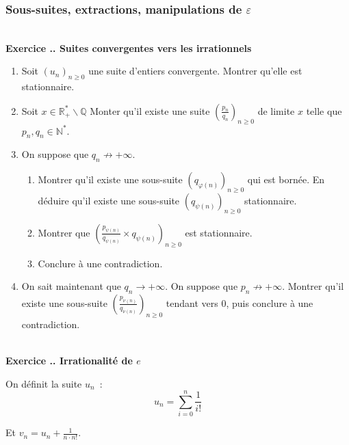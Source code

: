 \documentclass{article}
\newcommand{\mb}[1]{\mathbb{#1}}
\newcounter{exo}
\newcommand{\exercice}[1][\null]{\textbf{\\ Exercice \thesection.\theexo. #1} \addtocounter{exo}{1}}
\begin{document}
\subsubsection{Sous-suites, extractions, manipulations de $\varepsilon$}



\exercice[Suites convergentes vers les irrationnels]

\begin{enumerate}

\item Soit $(u_n)_{n \ge 0}$ une suite d'entiers convergente. Montrer qu'elle est stationnaire.

\item Soit $x\in \mb{R}^*_+ \smallsetminus \mb{Q}$ Monter qu'il existe une suite $\left(\frac{p_n}{q_n}\right)_{n \ge 0}$ de limite $x$ telle que $p_n, q_n \in \mb{N}^*$.

\item On suppose que $q_n \not \rightarrow + \infty$.

\begin{enumerate}

\item Montrer qu'il existe une sous-suite $(q_{\varphi(n)})_{n \ge 0}$ qui est bornée. En déduire qu'il existe une sous-suite $(q_{\psi(n)})_{n \ge 0}$ stationnaire.

\item Montrer que $\left(\frac{p_{\psi(n)}}{q_{\psi(n)}} \times q_{\psi(n)}\right)_{n \ge 0}$ est stationnaire.

\item Conclure à une contradiction.
\end{enumerate}

\item On sait maintenant que $q_n \to + \infty$. On suppose que $p_n \not \rightarrow + \infty$. Montrer qu'il existe une sous-suite $\left(\frac{p_{\nu(n)}}{q_{\nu(n)}}\right)_{n \ge 0}$ tendant vers $0$, puis conclure à une contradiction.

\end{enumerate}

\exercice[Irrationalité de $e$]

On définit la suite $u_n$~:
\begin{equation*}
    u_n = \sum_{i = 0}^n \frac{1}{i !} 
\end{equation*}


Et $v_n = u_n + \frac{1}{n \cdot n!}$.
\end{document}
